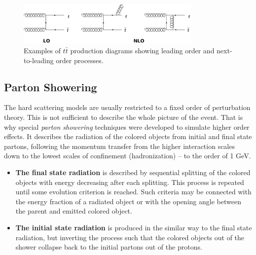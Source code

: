 \begin{figure}[t]
  \centering
  \includegraphics[width=0.8\textwidth]{03_simulation/plots/LO_NLO_ex.png}
  \caption{Examples of $t\bar{t}$ production diagrams showing leading order and next-to-leading order processes.}
  \label{fig:LO_NLO_ex}
\end{figure}

\subsection{Parton Showering}

The hard scattering models are usually restricted to a fixed order of perturbation theory. This is not sufficient to describe the 
whole picture of the event. That is why special \textit{parton showering} techniques were developed to simulate 
higher order effects. It describes the radiation of the colored objects from initial and final state partons,
following the momentum transfer from the higher interaction scales down to the lowest scales of confinement (hadronization) --
to the order of 1 GeV.


\begin{itemize}
 \item \textbf{The final state radiation} is described by sequential splitting of the colored objects with energy decreasing
 after each splitting. This process is repeated until some evolution criterion is reached. Such criteria may be connected
 with the energy fraction of a radiated object or with the opening angle between the parent and emitted colored object.
 
 \item \textbf{The initial state radiation} is produced in the similar way to the final state radiation, but inverting
 the process such that the colored objects out of the shower collapse back to the initial partons out of the protons.
\end{itemize}

